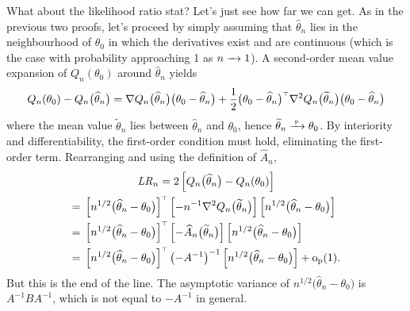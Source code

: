 \documentclass[11pt,letterpaper,reqno,oneside]{article}
\begin{document}
What about the likelihood ratio stat? Let's just see how far we can get. As in the previous two proofs, let's proceed by simply assuming that $\widehat{\theta}_n$ lies in the neighbourhood of $\theta_0$ in which the derivatives exist and are continuous (which is the case with probability approaching 1 as $n\xrightarrow{\;\;\;} 1$). A second-order mean value expansion of $Q_n(\theta_0)$ around $\widehat{\theta}_n$ yields
%
\begin{equation*}
	Q_n(\theta_0) - Q_n\bigl( \widehat{\theta}_n \bigr)
	= \nabla Q_n\bigl( \widehat{\theta}_n \bigr) 
	\bigl( \theta_0 - \widehat{\theta}_n \bigr)
	+ \frac{1}{2}
	\bigl( \theta_0 - \widehat{\theta}_n \bigr)^{\scriptscriptstyle \top}
	\nabla^2 Q_n\bigl( \widetilde{\theta}_n \bigr) 
	\bigl( \theta_0 - \widehat{\theta}_n \bigr)
\end{equation*}
%
where the mean value $\widetilde{\theta}_n$ lies between $\widehat{\theta}_n$ and $\theta_0$, hence $\widetilde{\theta}_n \xrightarrow{{\scriptscriptstyle \mathrm{\;p\;}}} \theta_0$. By interiority and differentiability, the first-order condition must hold, eliminating the first-order term. Rearranging and using the definition of $\widehat{A}_n$,
%
\begin{multline*}
	\mathit{LR}_n
	= 2 \left[ Q_n\bigl( \widehat{\theta}_n \bigr)
	- Q_n(\theta_0) \right]
	\\
	\begin{aligned}
		={}& \left[ n^{1/2} \bigl( \widehat{\theta}_n - \theta_0 \bigr) \right]^{\scriptscriptstyle \top}
		\left[ - n^{-1} \nabla^2 Q_n\bigl( \widetilde{\theta}_n \bigr) \right]
		\left[ n^{1/2} \bigl( \widehat{\theta}_n - \theta_0 \bigr) \right]
		\\
		={}& \left[ n^{1/2} \bigl( \widehat{\theta}_n - \theta_0 \bigr) \right]^{\scriptscriptstyle \top}
		\left[ - \widehat{A}_n\bigl( \widetilde{\theta}_n \bigr) \right]
		\left[ n^{1/2} \bigl( \widehat{\theta}_n - \theta_0 \bigr) \right]
		\\
		={}& \left[ n^{1/2} \bigl( \widehat{\theta}_n - \theta_0 \bigr) \right]^{\scriptscriptstyle \top}
		\left( -A^{-1} \right)^{-1}
		\left[ n^{1/2} \bigl( \widehat{\theta}_n - \theta_0 \bigr) \right]
		+ \mathrm{o}_{\mathrm{p}}(1) .
	\end{aligned}
\end{multline*}
%
But this is the end of the line. The asymptotic variance of $n^{1/2} \bigl( \widehat{\theta}_n - \theta_0 \bigr)$ is $A^{-1} B A^{-1}$, which is not equal to $-A^{-1}$ in general.
\end{document}
